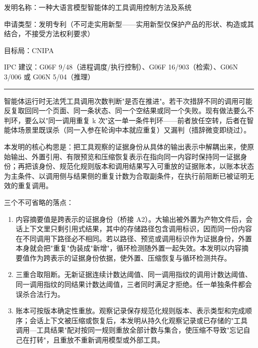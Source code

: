 \documentclass[11pt,UTF8]{ctexart}
\begin{document}

{\ntbf 发明名称}：一种大语言模型智能体的工具调用控制方法及系统

{\ntbf 申请类型}：发明专利（不可走实用新型——实用新型仅保护产品的形状、构造或其结合，不接受方法权利要求）

{\ntbf 目标局}：CNIPA

{\ntbf IPC 建议}：G06F 9/48（进程调度/执行控制）、G06F 16/903（检索）、G06N 3/006 或 G06N 5/04（推理）

\par\vspace{2mm}\hrule\vspace{3mm}


智能体运行时无法凭工具调用次数判断"是否在推进"。若干次措辞不同的调用可能反复取回同一个页面、同一条状态、同一个空结果或同一个失败。现有做法要么不判环，要么以"同一调用重复 k 次"这一单一条件判环——前者放任空转，后者在智能体场景里既误杀（同一入参在轮询中本就应重复）又漏判（措辞微变即绕过）。

本发明的核心构思是：{\ntbf 把工具观察的证据身份从具体的输出表示中解耦出来，使原始输出、外置引用、有限预览和压缩恢复表示在指向同一内容时保持同一证据身份；再把该身份、规范化规则版本和调用结果写入可重放的证据账本，以账本状态为主条件、以调用侧与结果侧的重复计数为合取副条件，在执行前阻断已被证明无效的重复调用。}

三个不可省略的落点：

\begin{enumerate}
  \item {\ntbf 内容摘要值是跨表示的证据身份}（桥接 A2）。大输出被外置为产物文件后，会话上下文里只剩引用式结果，其中的存储路径包含调用标识，因而同一份内容在不同调用下路径必不相同。若以路径、预览或调用标识作为证据身份，外置本身就会把"重复"伪装成"新增"，循环检测随外置一起失效。本发明以内容摘要值作为跨表示的证据身份依据，使外置、压缩恢复与循环检测共存。
  \item {\ntbf 三重合取阻断}。无新证据连续计数达阈值、同一调用指纹的调用计数达阈值、同一调用指纹的同结果计数达阈值，三者同时满足才拒绝。任一单独条件都会误杀合法行为。
  \item {\ntbf 账本可按版本确定性重放}。观察记录保存规范化规则版本、表示类型和完成顺序；会话上下文被压缩或恢复后，本发明从持久化观察记录或已存储的"工具调用—工具结果"配对按同一规则重放全部计数与集合，使压缩不导致"忘记自己在打转"，且重放不重新调用模型或外部工具。
\end{enumerate}

\end{document}
